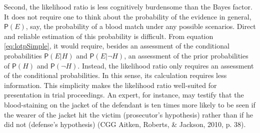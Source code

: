 \documentclass[
  10pt,
  dvipsnames,enabledeprecatedfontcommands]{scrartcl}
\newcommand{\pr}[1]{\mathsf{P}(#1)}
\begin{document}
Second, the likelihood ratio is less cognitively burdensome than the
Bayes factor. It does not require one to think about the probability of
the evidence in general, \(\pr{E}\), say, the probability of a blood
match under any possible scenarios. Direct and reliable estimation of
this probability is difficult. From equation \eqref{eq:lotpSimple}, it
would require, besides an assessment of the conditional probabilities
\(\pr{E\vert H}\) and \(\pr{E\vert \neg H}\), an assessment of the prior
probabilities of \(\pr{H}\) and \(\pr{\neg H}\). Instead, the likelihood
ratio only requires an assessment of the conditional probabilities. In
this sense, its calculation requires less information. This simplicity
makes the likelihood ratio well-suited for presentation in trial
proceedings. An expert, for instance, may testify that the
blood-staining on the jacket of the defendant is ten times more likely
to be seen if the wearer of the jacket hit the victim (prosecutor's
hypothesis) rather than if he did not (defense's hypothesis) (CGG
Aitken, Roberts, \& Jackson, 2010, p. 38).
\end{document}
